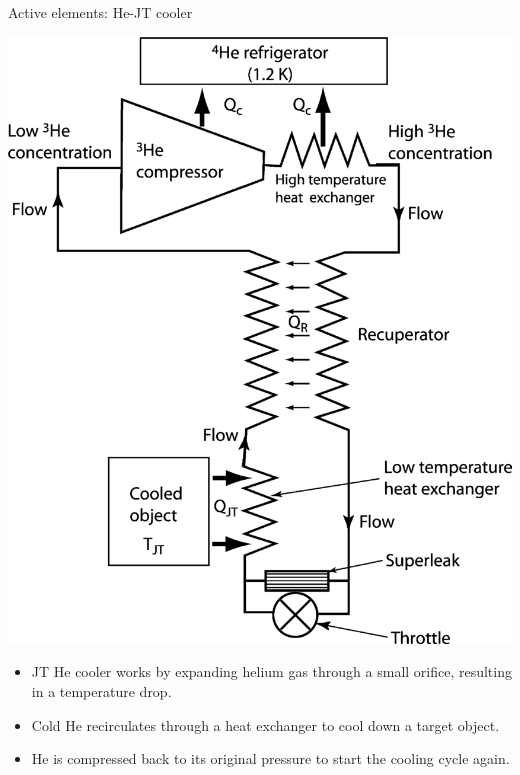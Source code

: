 \begin{frame}{Active elements: He-JT cooler}
\begin{minipage}{0.4\textwidth}
    \includegraphics[width=0.9\linewidth]{Figures/JTHE.png} 
\end{minipage}
\begin{minipage}{0.5\textwidth}
\begin{itemize}
    \item JT He cooler works by expanding helium gas through a small orifice, resulting in a temperature drop. 
    \item Cold He recirculates through a heat exchanger to cool down a target object.
    \item He is compressed back to its original pressure to start the cooling cycle again.
\end{itemize}
\end{minipage}
\end{frame}




